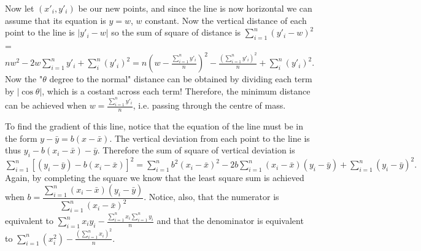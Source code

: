 \documentclass[11pt,a4paper]{article}
\begin{document}
\begin {enumerate}
Now let $(x'_i,y'_i)$ be our new points, and since the line is now horizontal we can assume that its equation is $y=w$, $w$ constant. Now the vertical distance of each point to the line is $|y'_i-w|$ so the sum of square of distance is $\displaystyle\sum_{i=1}^{n} (y'_i-w)^{2}$=$nw^{2}-2w\displaystyle\sum_{i=1}^{n} y'_i+\displaystyle\sum^{n}_{i} (y'_i)^{2}=n\left(w-\frac{\displaystyle\sum_{i=1}^{n} y'_i}{n}\right)^{2}-\frac{\left(\displaystyle\sum_{i=1}^{n} y'_i\right)^{2}}{n}+\displaystyle\sum^{n}_{i} (y'_i)^{2}.$ Now the "$\theta$ degree to the normal" distance can be obtained by dividing each term by $|\cos\theta|$, which is a costant across each term! Therefore, the minimum distance can be achieved when $w=\frac{\displaystyle\sum_{i=1}^{n} y'_i}{n}$, i.e. passing through the centre of mass.

To find the gradient of this line, notice that the equation of the line must be in the form $y-\bar{y}=b(x-\bar{x}).$ The vertical deviation from each point to the line is thus $y_i-b(x_i-\bar{x})-\bar{y}$. Therefore the sum of square of vertical deviation is $\displaystyle\sum_{i=1}^{n} [(y_i-\bar{y})-b(x_i-\bar{x})]^{2}=\displaystyle\sum_{i=1}^{n} b^{2}(x_i-\bar{x})^{2}-2b\displaystyle\sum_{i=1}^{n} (x_i-\bar{x})(y_i-\bar{y})+\displaystyle\sum_{i=1}^{n} (y_i-\bar{y})^{2}.$ Again, by completing the square we know that the least square sum is achieved when $b=\dfrac{\displaystyle\sum_{i=1}^{n}(x_i-\bar{x})(y_i-\bar{y})}{\displaystyle\sum_{i=1}^{n}(x_i-\bar{x})^{2}}$. Notice, also, that the numerator is equivalent to $\displaystyle\sum_{i=1}^{n} x_i y_i-\frac{\displaystyle\sum_{i=1}^{n}x_i \displaystyle\sum_{i=1}^{n} y_i}{n}$ and that the denominator is equivalent to $\displaystyle\sum_{i=1}^{n} (x_{i}^{2})-\frac{\left(\displaystyle\sum_{i=1}^{n} x_i\right)^{2}}{n}$.

\end {enumerate}
\end{document}
